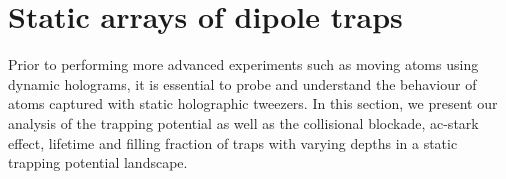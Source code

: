\documentclass[../Thesis-IJspeert.tex]{subfiles}
\begin{document}
\section{Static arrays of dipole traps}
Prior to performing more advanced experiments such as moving atoms using dynamic holograms, it is essential to probe and understand the behaviour of atoms captured with static holographic tweezers. In this section, we present our analysis of the trapping potential as well as the collisional blockade, ac-stark effect, lifetime and filling fraction of traps with varying depths in a static trapping potential landscape.






\end{document}
